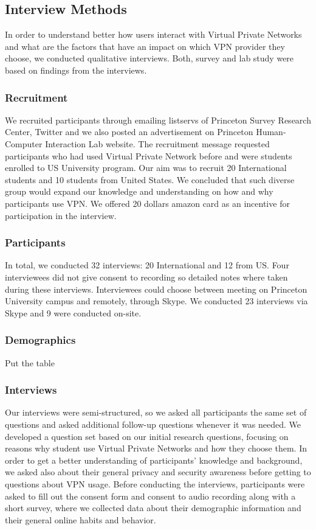 \subsection{Interview Methods}\label{Method} 

In order to understand better how
users interact with Virtual Private Networks and what are the factors that
have an impact on which VPN provider they choose, we conducted qualitative
interviews. Both, survey and lab study were based on findings from the
interviews.  \subsubsection{Recruitment} We recruited participants through
emailing listservs of Princeton Survey Research Center, Twitter and we also
posted an advertisement on Princeton Human-Computer Interaction Lab website.
The recruitment message requested participants who had used Virtual Private
Network before and were students enrolled to US University program. Our aim
was to recruit 20 International students and 10 students from United States.
We concluded that such diverse group would expand our knowledge and
understanding on how and why participants use VPN. We offered 20 dollars
amazon card as an incentive for participation in the interview.
\subsubsection{Participants} In total, we conducted 32 interviews: 20
International and 12 from US. Four interviewees did not give consent to
recording so detailed notes where taken during these interviews. Interviewees
could choose between meeting on Princeton University campus and remotely,
through Skype. We conducted 23 interviews via Skype and 9 were conducted
on-site. 

\subsubsection{Demographics} Put the table

\subsubsection{Interviews} Our interviews were semi-structured, so we asked
all participants the same set of questions and asked additional follow-up
questions whenever it was needed. We developed a question set based on our
initial research questions, focusing on reasons why student use Virtual
Private Networks and how they choose them. In order to get a better
understanding of participants' knowledge and background, we asked also about
their general privacy and security awareness before getting to questions about
VPN usage.  Before conducting the interviews, participants were asked to fill
out the consent form and consent to audio recording along with a short survey,
where we collected data about their demographic information and their general
online habits and behavior. 


